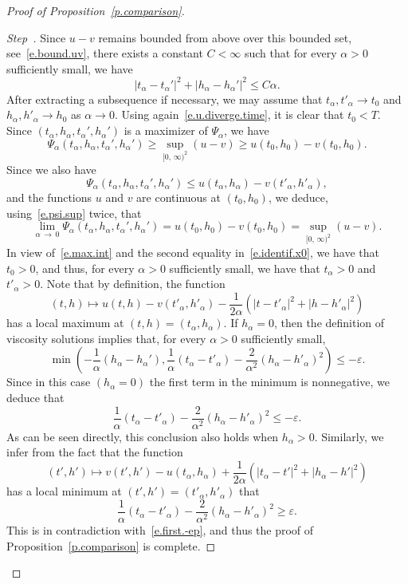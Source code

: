 \documentclass[AHL,Unicode,longabstracts,published]{cedram}
\newcommand{\1}{\mathds{1}}
\newcommand{\ep}{\varepsilon}
\renewcommand{\le}{\leqslant}
\renewcommand{\ge}{\geqslant}
\newcommand{\al}{\alpha}
\newcounter{stepcount}
\newenvironment{step}{\refstepcounter{stepcount}\begin{proof}[Step~\thestepcount]}{\let\qed\relax\end{proof}}
\begin{document}
\begin{proof}[Proof of Proposition~\ref{p.comparison}]
\begin{step}

Since $u - v$ remains bounded from above over this bounded set, see~\eqref{e.bound.uv}, there exists a constant $C < \infty$ such that for every $\al > 0$ sufficiently small, we have
\[
\left|t_\al-t_\al'\right|^2 + \left|h_\al-h_\al'\right|^2 \le C \al.
\]
After extracting a subsequence if necessary, we may assume that $t_\alpha,t'_\alpha \to t_0$ and $h_\al,h'_\al \to h_0$ as $\alpha \to 0$. Using again~\eqref{e.u.diverge.time}, it is clear that $t_0 < T$. Since $(t_\al,h_\al,t_\al',h_\al')$ is a maximizer of $\Psi_\al$, we have
\begin{equation}\label{e.psi.sup}
\Psi_\al\left(t_\al,h_\al,t_\al',h_\al'\right) \ge \sup_{[0,\,\infty)^2} (u-v) \ge u(t_0,h_0) - v(t_0,h_0).
\end{equation}
Since we also have
\[
\Psi_\alpha\left(t_\al,h_\al,t_\al',h_\al'\right) \le u\left(t_\alpha,h_\al\right) - v\left(t'_\al,h'_\alpha\right),
\]
and the functions $u$ and $v$ are continuous at $(t_0,h_0)$, we deduce, using~\eqref{e.psi.sup} twice, that
\begin{equation}\label{e.identif.x0}
\lim_{\al\,\to\,0} \Psi_{\alpha}\left(t_\al,h_\al,t_\al',h_\al'\right) = u(t_0,h_0) - v(t_0,h_0) = \sup_{[0,\,\infty)^2} (u-v).
\end{equation}
In view of~\eqref{e.max.int} and the second equality in~\eqref{e.identif.x0}, we have that $t_0 > 0$, and thus, for every $\al > 0$ sufficiently small, we have that $t_\al > 0$ and $t'_\al > 0$. Note that by definition, the function
\[
(t,h) \mapsto u(t,h) - v\left(t'_\al,h'_\al\right) - \frac 1 {2\al} \left(\left|t-t'_\al\right|^2 + \left|h-h'_\al\right|^2 \right)
\]
has a local maximum at $(t,h) = (t_\al,h_\al)$. If $h_\al = 0$, then the definition of viscosity solutions implies that, for every $\alpha > 0$ sufficiently small,
\[
\min \left(-\frac 1 \alpha \left(h_\al - h_\al'\right), \frac{1}{\al} \left(t_\al - t'_\al\right) - \frac{2}{\al^2} \left(h_\al - h'_\al\right)^2 \right)\le -\ep.
\]
Since in this case $(h_\al = 0)$ the first term in the minimum is nonnegative, we deduce that
\begin{equation}\label{e.first.-ep}
\frac{1}{\al} \left(t_\al - t'_\al\right) - \frac{2}{\al^2} \left(h_\al - h'_\al\right)^2\le -\ep.
\end{equation}
As can be seen directly, this conclusion also holds when $h_\al > 0$. Similarly, we infer from the fact that the function
\[
\left(t',h'\right) \mapsto v\left(t',h'\right) - u\left(t_\al,h_\al\right) + \frac 1 {2\al}\left(\left|t_\al-t'\right|^2 + \left|h_\al-h'\right|^2 \right)
\]
has a local minimum at $(t',h') = (t'_\al,h'_\al)$ that
\[
\frac{1}{\al} \left(t_\al - t'_\al\right) - \frac{2}{\al^2} \left(h_\al - h'_\al\right)^2 \ge \ep.
\]
This is in contradiction with~\eqref{e.first.-ep}, and thus the proof of Proposition~\ref{p.comparison} is com\-plete.\qedhere
\end{step}\let\qed\relax
\end{proof}
\end{document}
